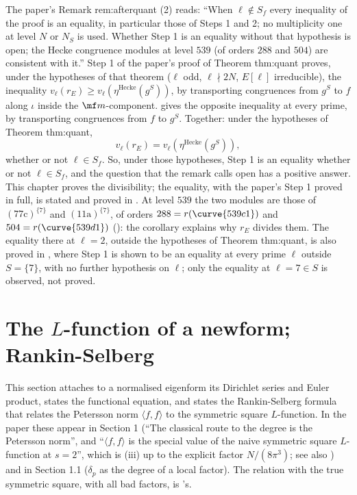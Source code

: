 \begin{remark}\label{rem:hecke:commentary-step1}
The paper's Remark rem:afterquant (2) reads: ``When $\ell\notin S_f$ every inequality of the proof is an equality, in particular those of Steps 1 and 2; no multiplicity one at level $N$ or
$N_S$ is used. Whether Step 1 is an equality without that hypothesis is open; the Hecke congruence modules at level $539$ (of orders $288$ and $504$) are consistent with it.''
Step 1 of the paper's proof of Theorem thm:quant proves, under the hypotheses of that theorem ($\ell$ odd, $\ell\nmid2N$, $E[\ell]$ irreducible), the inequality
$v_\ell(r_E)\ge v_\ell(\eta^{\mathrm{Hecke}}(g^S))$, by transporting congruences from $g^S$ to $f$ along $\iota$ inside the $\mf m$-component.  gives the opposite
inequality at every prime, by transporting congruences from $f$ to $g^S$. Together: under the hypotheses of Theorem thm:quant,
\[
v_\ell(r_E)=v_\ell(\eta^{\mathrm{Hecke}}(g^S)),
\]
whether or not $\ell\in S_f$. So, under those hypotheses, Step 1 is an equality whether or not $\ell\in S_f$, and the question that the remark calls open has a positive answer. This chapter proves the divisibility; the equality, with the paper's Step 1 proved in full, is stated and proved in . At level $539$ the
two modules are those of $(\text{77c})^{\{7\}}$ and $(\text{11a})^{\{7\}}$, of orders $288=r(\curve{539c1})$ and $504=r(\curve{539d1})$ (): the corollary explains why
$r_E$ divides them. The equality there at $\ell=2$, outside the hypotheses of Theorem thm:quant, is also proved in , where Step 1 is shown to be an equality at every prime $\ell$ outside $S=\{7\}$, with no further hypothesis on $\ell$; only the equality at $\ell=7\in S$ is observed, not proved.
\end{remark}

\section{The $L$-function of a newform; Rankin-Selberg}\label{sec:hecke:lfunctions}

This section attaches to a normalised eigenform its Dirichlet series and Euler product, states the functional equation, and states the Rankin-Selberg formula that relates
the Petersson norm $\langle f,f\rangle$ to the symmetric square $L$-function. In the paper these appear in Section 1 (``The classical route to the degree is the Petersson norm'', and
``$\langle f,f\rangle$ is the special value of the naive symmetric square $L$-function at $s=2$'', which is (iii) up to the explicit factor $N/(8\pi^3)$; see also
) and in Section 1.1 ($\delta_p$ as the degree of a local factor). The relation with the true symmetric square, with all bad factors, is 's.


